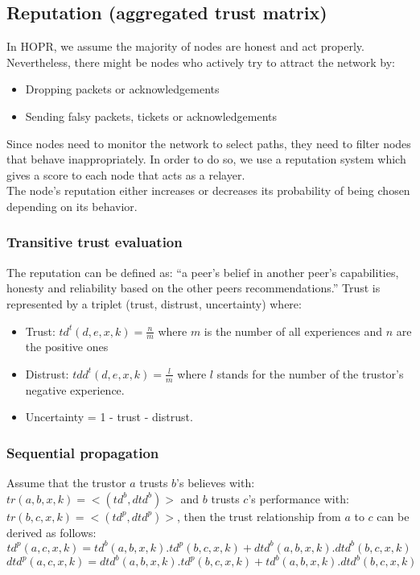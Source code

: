 \subsection{Reputation (aggregated trust matrix)}
In HOPR, we assume the majority of nodes are honest and act properly. Nevertheless, there might be nodes who actively try to attract the network by:
\begin{itemize}
    \item Dropping packets or acknowledgements
    \item Sending falsy packets, tickets or acknowledgements
\end{itemize}
Since nodes need to monitor the network to select paths, they need to filter nodes that behave inappropriately. 
In order to do so, we use a reputation system which gives a score to each node that acts as a relayer. 
\\The node’s reputation either increases or decreases its probability of being chosen depending on its behavior.

\subsubsection{Transitive trust evaluation }  
The reputation can be defined as: “a peer’s belief in another peer’s capabilities, honesty and reliability based on the other peers recommendations.”
Trust is represented by a triplet (trust, distrust, uncertainty) where:
\begin{itemize}
    \item Trust: $td^t(d,e,x,k)=\frac{n}{m}$ where $m$ is the number of all experiences and $n$ are the positive ones
    \item Distrust: $tdd^t(d,e,x,k)=\frac{l}{m}$ where $l$ stands for the number of the trustor’s negative experience.
    \item Uncertainty = 1 - trust - distrust.
\end{itemize}

\subsubsection*{Sequential propagation}
Assume that the trustor $a$ trusts $b$’s believes with: 
$tr(a,b,x,k)=<(td^b,dtd^b)>$ and $b$ trusts $c$’s performance with: 
$tr(b,c,x,k)=<(td^p,dtd^p)>$, then the trust relationship from $a$ to $c$ can be derived as follows:
$$td^p(a,c,x,k)=td^b(a,b,x,k).td^p(b,c,x,k)+ dtd^b(a,b,x,k).dtd^b(b,c,x,k)$$
$$dtd^p(a,c,x,k)=dtd^b(a,b,x,k).td^p(b,c,x,k) + td^b(a,b,x,k).dtd^b(b,c,x,k)$$

